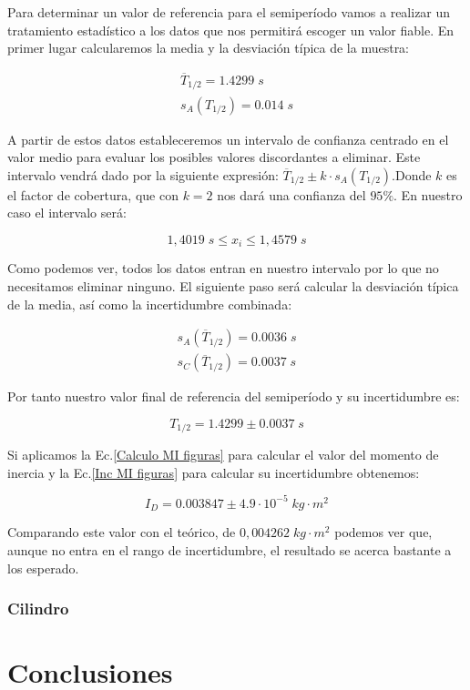 \documentclass[a4paper,12pt,titlepage]{article}
\begin{document}
Para determinar un valor de referencia para el semiperíodo vamos a realizar un tratamiento estadístico a los datos que nos permitirá escoger un valor fiable. En primer lugar calcularemos la media y la desviación típica de la muestra:

\begin{equation}
    \begin{gathered}
        \overline{T}_{1/2} = 1.4299 \; s\\
        s_A(T_{1/2}) = 0.014 \; s
    \end{gathered}
\end{equation}

A partir de estos datos estableceremos un intervalo de confianza centrado en el valor medio para evaluar los posibles valores discordantes a eliminar. Este intervalo vendrá dado por la siguiente expresión: $\overline{T}_{1/2} \pm k\cdot s_A(T_{1/2})$.Donde $k$ es el factor de cobertura, que con $k=2$ nos dará una confianza del $95\%$. En nuestro caso el intervalo será:

\begin{equation}
    1,4019 \; s \leq x_i \leq 1,4579 \; s
\end{equation}

Como podemos ver, todos los datos entran en nuestro intervalo por lo que no necesitamos eliminar ninguno. El siguiente paso será calcular la desviación típica de la media, así como la incertidumbre combinada:

\begin{equation}
    \begin{gathered}
        s_A(\overline{T}_{1/2}) = 0.0036 \; s\\
        s_C(\overline{T}_{1/2}) = 0.0037 \; s
    \end{gathered}
\end{equation}

Por tanto nuestro valor final de referencia del semiperíodo y su incertidumbre es:

\begin{equation}
    T_{1/2} = 1.4299 \pm 0.0037 \; s
\end{equation}

Si aplicamos la Ec.\ref{Calculo MI figuras} para calcular el valor del momento de inercia y la Ec.\ref{Inc MI figuras} para calcular su incertidumbre obtenemos:

\begin{equation}
    I_D = 0.003847 \pm 4.9 \cdot 10^{-5} \; kg\cdot m^2
\end{equation}

Comparando este valor con el teórico, de $0,004262 \; kg \cdot m^2$ podemos ver que, aunque no entra en el rango de incertidumbre, el resultado se acerca bastante a los esperado.

\subsubsection{Cilindro}



\section{Conclusiones}
\end{document}
